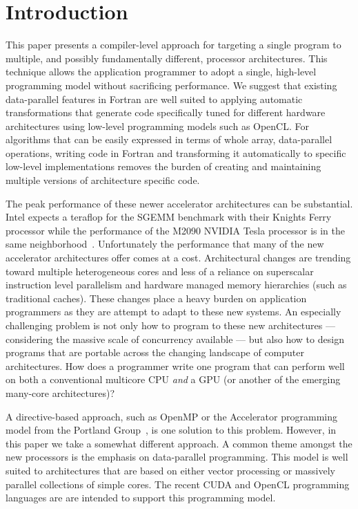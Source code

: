 \section{Introduction}
\label{sec:intro}

This paper presents a compiler-level approach for targeting a single program to
multiple, and possibly fundamentally different, processor architectures.  This
technique allows the application programmer to adopt a single, high-level
programming model without sacrificing performance.  We suggest that existing
data-parallel features in Fortran are well suited to applying automatic
transformations that generate code specifically tuned for different hardware
architectures using low-level programming models such as OpenCL.  For algorithms
that can be easily expressed in terms of whole array, data-parallel operations,
writing code in Fortran and transforming it automatically to specific low-level
implementations removes the burden of creating and maintaining multiple versions
of architecture specific code.

The peak performance of these newer accelerator architectures can be substantial.
Intel expects a teraflop for the SGEMM benchmark with their Knights Ferry
processor while the performance of the M2090 NVIDIA Tesla processor is in the
same neighborhood~\cite{hpcwire11manycore}.  Unfortunately the performance that
many of the new accelerator architectures offer comes at a cost.  Architectural
changes are trending toward multiple heterogeneous cores and less of a reliance
on superscalar instruction level parallelism and hardware managed memory
hierarchies (such as traditional caches).  These changes place a heavy burden on
application programmers as they are attempt to adapt to these new systems.  An
especially challenging problem is not only how to program to these new
architectures --- considering the massive scale of concurrency available --- but
also how to design programs that are portable across the changing landscape of
computer architectures.  How does a programmer write one program that can
perform well on both a conventional multicore CPU \emph{and} a GPU (or another
of the emerging many-core architectures)?

A directive-based approach, such as OpenMP or the Accelerator programming model
from the Portland Group~\cite{pgi10accelerator}, is one solution to this
problem.  However, in this paper we take a somewhat different approach.  A
common theme amongst the new processors is the emphasis on data-parallel
programming.  This model is well suited to architectures that are
based on either vector processing or massively parallel collections of simple
cores.  The recent CUDA and OpenCL programming languages are are intended to
support this programming model.

